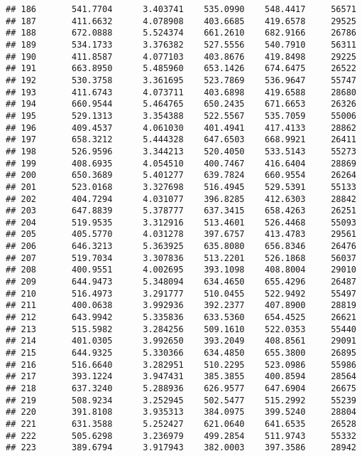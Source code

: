 \documentclass[]{article}
\begin{document}
\begin{verbatim}
## 186       541.7704      3.403741    535.0990    548.4417     56571
## 187       411.6632      4.078908    403.6685    419.6578     29525
## 188       672.0888      5.524374    661.2610    682.9166     26786
## 189       534.1733      3.376382    527.5556    540.7910     56311
## 190       411.8587      4.077103    403.8676    419.8498     29225
## 191       663.8950      5.485960    653.1426    674.6475     26522
## 192       530.3758      3.361695    523.7869    536.9647     55747
## 193       411.6743      4.073711    403.6898    419.6588     28680
## 194       660.9544      5.464765    650.2435    671.6653     26326
## 195       529.1313      3.354388    522.5567    535.7059     55006
## 196       409.4537      4.061030    401.4941    417.4133     28862
## 197       658.3212      5.444328    647.6503    668.9921     26411
## 198       526.9596      3.344213    520.4050    533.5143     55273
## 199       408.6935      4.054510    400.7467    416.6404     28869
## 200       650.3689      5.401277    639.7824    660.9554     26264
## 201       523.0168      3.327698    516.4945    529.5391     55133
## 202       404.7294      4.031077    396.8285    412.6303     28842
## 203       647.8839      5.378777    637.3415    658.4263     26251
## 204       519.9535      3.312916    513.4601    526.4468     55093
## 205       405.5770      4.031278    397.6757    413.4783     29561
## 206       646.3213      5.363925    635.8080    656.8346     26476
## 207       519.7034      3.307836    513.2201    526.1868     56037
## 208       400.9551      4.002695    393.1098    408.8004     29010
## 209       644.9473      5.348094    634.4650    655.4296     26487
## 210       516.4973      3.291777    510.0455    522.9492     55497
## 211       400.0638      3.992936    392.2377    407.8900     28819
## 212       643.9942      5.335836    633.5360    654.4525     26621
## 213       515.5982      3.284256    509.1610    522.0353     55440
## 214       401.0305      3.992650    393.2049    408.8561     29091
## 215       644.9325      5.330366    634.4850    655.3800     26895
## 216       516.6640      3.282951    510.2295    523.0986     55986
## 217       393.1224      3.947431    385.3855    400.8594     28564
## 218       637.3240      5.288936    626.9577    647.6904     26675
## 219       508.9234      3.252945    502.5477    515.2992     55239
## 220       391.8108      3.935313    384.0975    399.5240     28804
## 221       631.3588      5.252427    621.0640    641.6535     26528
## 222       505.6298      3.236979    499.2854    511.9743     55332
## 223       389.6794      3.917943    382.0003    397.3586     28942

\end{verbatim}
\end{document}
